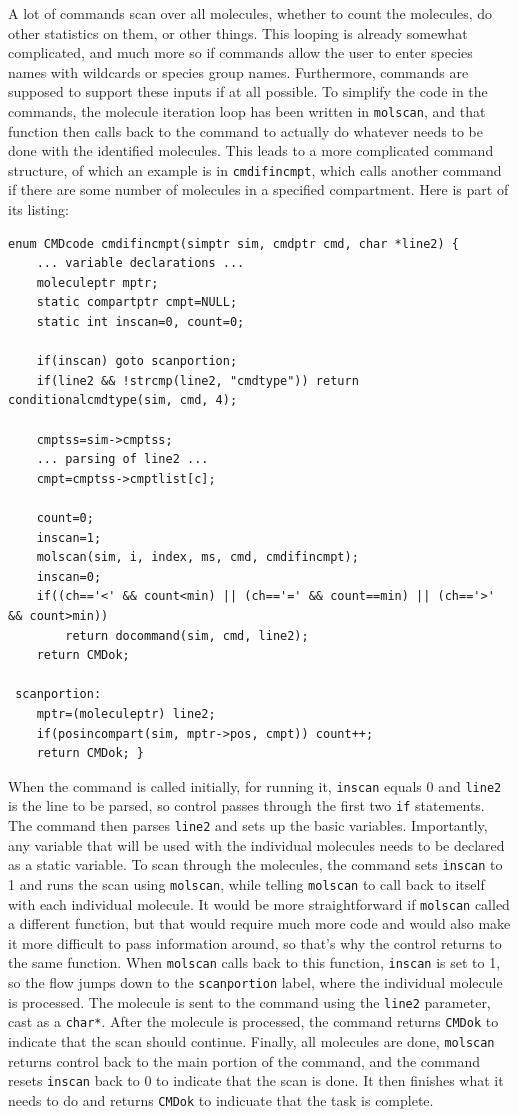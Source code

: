 \documentclass {scrbook}
\newcommand {\ttt} {\texttt}
\begin{document}
A lot of commands scan over all molecules, whether to count the molecules, do other statistics on them, or other things. This looping is already somewhat complicated, and much more so if commands allow the user to enter species names with wildcards or species group names. Furthermore, commands are supposed to support these inputs if at all possible. To simplify the code in the commands, the molecule iteration loop has been written in \ttt{molscan}, and that function then calls back to the command to actually do whatever needs to be done with the identified molecules. This leads to a more complicated command structure, of which an example is in \ttt{cmdifincmpt}, which calls another command if there are some number of molecules in a specified compartment. Here is part of its listing:

\begin{lstlisting}
enum CMDcode cmdifincmpt(simptr sim, cmdptr cmd, char *line2) {
	... variable declarations ...
	moleculeptr mptr;
	static compartptr cmpt=NULL;
	static int inscan=0, count=0;

	if(inscan) goto scanportion;
	if(line2 && !strcmp(line2, "cmdtype")) return conditionalcmdtype(sim, cmd, 4);

	cmptss=sim->cmptss;
	... parsing of line2 ...
	cmpt=cmptss->cmptlist[c];

	count=0;
	inscan=1;
	molscan(sim, i, index, ms, cmd, cmdifincmpt);
	inscan=0;
	if((ch=='<' && count<min) || (ch=='=' && count==min) || (ch=='>' && count>min))
		return docommand(sim, cmd, line2);
	return CMDok;

 scanportion:
	mptr=(moleculeptr) line2;
	if(posincompart(sim, mptr->pos, cmpt)) count++;
	return CMDok; }
\end{lstlisting}

When the command is called initially, for running it, \ttt{inscan} equals 0 and \ttt{line2} is the line to be parsed, so control passes through the first two \ttt{if} statements. The command then parses \ttt{line2} and sets up the basic variables. Importantly, any variable that will be used with the individual molecules needs to be declared as a static variable. To scan through the molecules, the command sets \ttt{inscan} to 1 and runs the scan using \ttt{molscan}, while telling \ttt{molscan} to call back to itself with each individual molecule. It would be more straightforward if \ttt{molscan} called a different function, but that would require much more code and would also make it more difficult to pass information around, so that's why the control returns to the same function. When \ttt{molscan} calls back to this function, \ttt{inscan} is set to 1, so the flow jumps down to the \ttt{scanportion} label, where the individual molecule is processed. The molecule is sent to the command using the \ttt{line2} parameter, cast as a \ttt{char*}. After the molecule is processed, the command returns \ttt{CMDok} to indicate that the scan should continue. Finally, all molecules are done, \ttt{molscan} returns control back to the main portion of the command, and the command resets \ttt{inscan} back to 0 to indicate that the scan is done. It then finishes what it needs to do and returns \ttt{CMDok} to indicuate that the task is complete.
\end{document}
